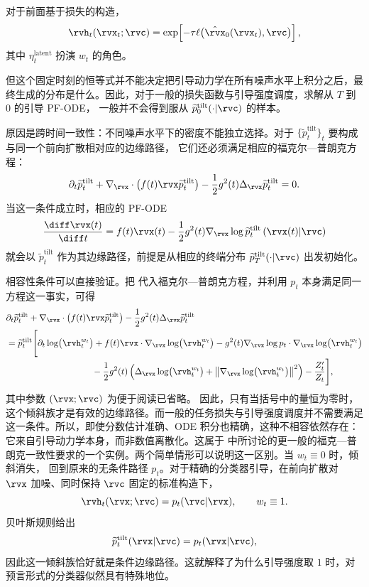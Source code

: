对于前面基于损失的构造，
\[
\rvh_t(\rvx_t;\rvc)
=
\exp\!\left[
-\tau\ell\bigl(\hat{\rvx}_0(\rvx_t),\rvc\bigr)
\right],
\]
其中 $\eta_t^{\mathrm{latent}}$ 扮演 $w_t$ 的角色。

但这个固定时刻的恒等式并不能决定把引导动力学在所有噪声水平上积分之后，最终生成的分布是什么。因此，对于一般的损失函数与引导强度调度，求解从 $T$ 到 $0$ 的引导 PF-ODE，
一般并不会得到服从
$\widetilde p_0^{\mathrm{tilt}}(\cdot|\rvc)$ 的样本。

原因是跨时间一致性：不同噪声水平下的密度不能独立选择。对于
$\{\widetilde p_t^{\mathrm{tilt}}\}_t$ 要构成与同一个前向扩散相对应的边缘路径，
它们还必须满足相应的福克尔—普朗克方程：
\[
\partial_t \widetilde p_t^{\mathrm{tilt}}
+
\nabla_{\rvx} \cdot
\bigl(f(t)\rvx \widetilde p_t^{\mathrm{tilt}}\bigr)
-
\frac{1}{2}g^2(t)
\Delta_{\rvx}\widetilde p_t^{\mathrm{tilt}}
=
0.
\]
当这一条件成立时，相应的 PF-ODE
\[
\frac{\diff\rvx(t)}{\diff t}
=
f(t)\rvx(t)
-
\frac{1}{2}g^2(t)
\nabla_{\rvx}\log
\widetilde p_t^{\mathrm{tilt}}\left(\rvx(t)|\rvc\right)
\]
就会以 $\widetilde p_t^{\mathrm{tilt}}$ 作为其边缘路径，前提是从相应的终端分布
$\widetilde p_T^{\mathrm{tilt}}(\cdot|\rvc)$ 出发初始化。


相容性条件可以直接验证。把
 代入福克尔—普朗克方程，并利用
$p_t$ 本身满足同一方程这一事实，可得
\begin{align*}
&
\partial_t \widetilde p_t^{\mathrm{tilt}}
+
\nabla_{\rvx} \cdot
\bigl(f(t)\rvx \widetilde p_t^{\mathrm{tilt}}\bigr)
-
\frac{1}{2}g^2(t)
\Delta_{\rvx}\widetilde p_t^{\mathrm{tilt}}
\\
&=
\widetilde p_t^{\mathrm{tilt}}
\Bigg[
\partial_t
\log \bigl(\rvh_t^{ w_t}\bigr)
+
f(t)\rvx\cdot
\nabla_{\rvx}\log \bigl(\rvh_t^{ w_t}\bigr)
-
g^2(t)
\nabla_{\rvx}\log p_t
\cdot
\nabla_{\rvx}\log \bigl(\rvh_t^{ w_t}\bigr)
\\[-2pt]
&\hspace{3.4cm}
-
\frac{1}{2}g^2(t)
\left(
\Delta_{\rvx}\log \bigl(\rvh_t^{ w_t}\bigr)
+
\left\|
\nabla_{\rvx}\log \bigl(\rvh_t^{ w_t}\bigr)
\right\|^2
\right)
-
\frac{Z_t'}{Z_t}
\Bigg],
\end{align*}
其中参数 $(\rvx;\rvc)$ 为便于阅读已省略。
因此，只有当括号中的量恒为零时，这个倾斜族才是有效的边缘路径。而一般的任务损失与引导强度调度并不需要满足这一条件。所以，即使分数估计准确、ODE 积分也精确，这种不相容依然存在：它来自引导动力学本身，而非数值离散化。这属于
\citep{lai2023fp} 中所讨论的更一般的福克—普朗克一致性要求的一个实例。两个简单情形可以说明这一区别。当 $w_t\equiv0$ 时，倾斜消失，
回到原来的无条件路径 $p_t$。对于精确的分类器引导，在前向扩散对
$\rvx$ 加噪、同时保持 $\rvc$ 固定的标准构造下，
\[
\rvh_t(\rvx;\rvc)
=
p_t(\rvc|\rvx),
\qquad
w_t\equiv1.
\]
贝叶斯规则给出
\[
\widetilde p_t^{\mathrm{tilt}}(\rvx|\rvc)
=
p_t(\rvx|\rvc),
\]
因此这一倾斜族恰好就是条件边缘路径。这就解释了为什么引导强度取 $1$ 时，对预言形式的分类器似然具有特殊地位。

